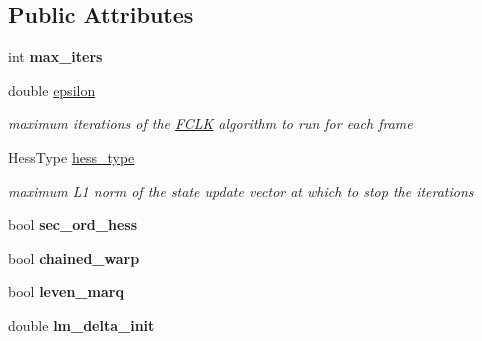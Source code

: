 \subsection*{Public Attributes}
\begin{DoxyCompactItemize}
\item 
\hypertarget{structFCLKParams_ae28b919859bdf27ea18b4667e2f2bd5b}{int {\bfseries max\-\_\-iters}}\label{structFCLKParams_ae28b919859bdf27ea18b4667e2f2bd5b}

\item 
\hypertarget{structFCLKParams_aade1acbbbc70e4bd3d16f98fdbea48bc}{double \hyperlink{structFCLKParams_aade1acbbbc70e4bd3d16f98fdbea48bc}{epsilon}}\label{structFCLKParams_aade1acbbbc70e4bd3d16f98fdbea48bc}

\begin{DoxyCompactList}\small\item\em maximum iterations of the \hyperlink{classFCLK}{F\-C\-L\-K} algorithm to run for each frame \end{DoxyCompactList}\item 
\hypertarget{structFCLKParams_a7ff564478a6a523aaa108524b9700443}{Hess\-Type \hyperlink{structFCLKParams_a7ff564478a6a523aaa108524b9700443}{hess\-\_\-type}}\label{structFCLKParams_a7ff564478a6a523aaa108524b9700443}

\begin{DoxyCompactList}\small\item\em maximum L1 norm of the state update vector at which to stop the iterations \end{DoxyCompactList}\item 
\hypertarget{structFCLKParams_a3bb148d66d5beeb50e505f7672b0b6b8}{bool {\bfseries sec\-\_\-ord\-\_\-hess}}\label{structFCLKParams_a3bb148d66d5beeb50e505f7672b0b6b8}

\item 
\hypertarget{structFCLKParams_a9641117ad4a414a37975865c4ab7a788}{bool {\bfseries chained\-\_\-warp}}\label{structFCLKParams_a9641117ad4a414a37975865c4ab7a788}

\item 
\hypertarget{structFCLKParams_afa9a0d33d4933e32ebb0bbcb4a5bfbf3}{bool {\bfseries leven\-\_\-marq}}\label{structFCLKParams_afa9a0d33d4933e32ebb0bbcb4a5bfbf3}

\item 
\hypertarget{structFCLKParams_a371dc5f3519f88054d804cd76ef19e4a}{double {\bfseries lm\-\_\-delta\-\_\-init}}\label{structFCLKParams_a371dc5f3519f88054d804cd76ef19e4a}


\end{DoxyCompactItemize}
